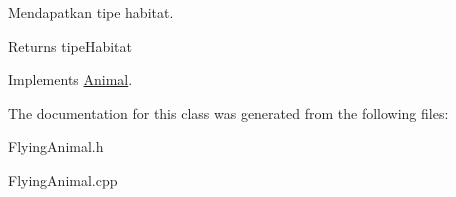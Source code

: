 Mendapatkan tipe habitat. 

\begin{DoxyReturn}{Returns}
tipe\-Habitat 
\end{DoxyReturn}


Implements \hyperlink{classAnimal}{Animal}.



The documentation for this class was generated from the following files\-:\begin{DoxyCompactItemize}
\item 
Flying\-Animal.\-h\item 
Flying\-Animal.\-cpp\end{DoxyCompactItemize}
